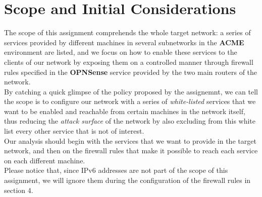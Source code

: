\section{Scope and Initial Considerations}
The scope of this assignment comprehends the whole target network: a series of services provided by different machines in several subnetworks in the \textbf{ACME} environment are listed, and we focus on how to enable these services to the clients of our network by exposing them on a controlled manner through firewall rules specified in the \textbf{OPNSense} service provided by the two main routers of the network.\\
By catching a quick glimpse of the policy proposed by the assignemnt, we can tell the scope is to configure our network with a series of \textit{white-listed} services that we want to be enabled and reachable from certain machines in the network itself, thus reducing the \textit{attack surface} of the network by also excluding from this white list every other service that is not of interest.\\
Our analysis should begin with the services that we want to provide in the target network, and then on the firewall rules that make it possible to reach each service on each different machine.\\
Please notice that, since IPv6 addresses are not part of the scope of this assignment, we will ignore them during the configuration of the firewall rules in section 4.\\
